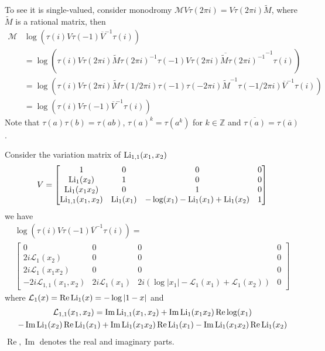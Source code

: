 \begin{remark}
To see it is single-valued, consider monodromy $\mathcal M V\tau(2\pi i)=V\tau(2\pi i)\widetilde M$, where $\widetilde M$ is a rational matrix, then
\begin{equation}
\begin{aligned}
\mathcal M&\log\left(\tau(i)V\tau(-1)\overline V^{-1}\tau(i)\right)\\
&=\log\left(\tau(i)V\tau(2\pi i)\widetilde M\tau(2\pi i)^{-1}\tau(-1)\overline{V\tau(2\pi i)\widetilde M\tau(2\pi i)^{-1}}^{-1}\tau(i)\right)\\
&=\log\left(\tau(i)V\tau(2\pi i)\widetilde M\tau(1/2\pi i)\tau(-1)\tau(-2\pi i)\widetilde M^{-1}\tau(-1/2\pi i)\overline V^{-1}\tau(i)\right)\\
&=\log\left(\tau(i)V\tau(-1)\overline V^{-1}\tau(i)\right)
\end{aligned}
\end{equation}
Note that $\tau(a)\tau(b)=\tau(ab)$, $\tau(a)^k=\tau(a^k)$ for $k\in\mathbb Z$ and $\overline{\tau(a)}=\tau(\overline a)$ .
\end{remark}

\begin{example}
Consider the variation matrix of $\operatorname{Li}_{1,1}(x_1,x_2)$
\[
V=\begin{bmatrix}
1&0&0&0\\
\operatorname{Li}_1(x_2)&1&0&0\\
\operatorname{Li}_1(x_1x_2)&0&1&0\\
\operatorname{Li}_{1,1}(x_1,x_2)&\operatorname{Li}_1(x_1)&-\log(x_1)-\operatorname{Li}_1(x_1)+\operatorname{Li}_1(x_2)&1
\end{bmatrix}
\]
we have
\begin{multline}
\log\left(\tau(i)V\tau(-1)\overline V^{-1}\tau(i)\right)=\\
\begin{bmatrix}
0&0&0&0\\
2i\mathcal L_1(x_2)&0&0&0\\
2i\mathcal L_1(x_1x_2)&0&0&0\\
-2i\mathcal L_{1,1}(x_1,x_2)&2i\mathcal L_1(x_1)&2i(\log|x_1|-\mathcal L_1(x_1)+\mathcal L_1(x_2))&0
\end{bmatrix}
\end{multline}
where $\mathcal L_1(x)=\operatorname{Re}\operatorname{Li}_1(x)=-\log|1-x|$ and
\begin{multline}
\mathcal L_{1,1}(x_1,x_2)=\operatorname{Im}\operatorname{Li}_{1,1}(x_1,x_2)+\operatorname{Im}\operatorname{Li}_1(x_1x_2)\operatorname{Re}\log(x_1)\\
-\operatorname{Im}\operatorname{Li}_1(x_2)\operatorname{Re}\operatorname{Li}_1(x_1)+\operatorname{Im}\operatorname{Li}_1(x_1x_2)\operatorname{Re}\operatorname{Li}_1(x_1)-\operatorname{Im}\operatorname{Li}_1(x_1x_2)\operatorname{Re}\operatorname{Li}_1(x_2)
\end{multline}
$\operatorname{Re},\operatorname{Im}$ denotes the real and imaginary parts.
\end{example}

